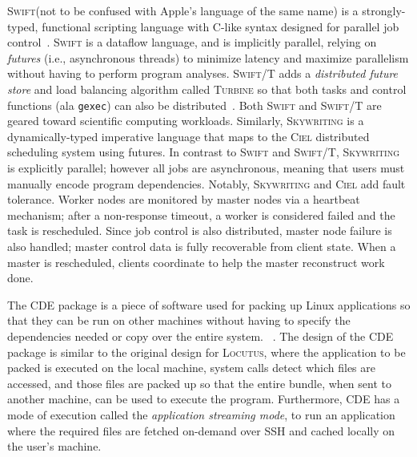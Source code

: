 \documentclass[11pt]{article}
\newcommand{\locutus}{\textsc{Locutus}\xspace}
\newcommand{\cde}{\textsc{CDE}\xspace}
\newcommand{\gexec}{\texttt{gexec}}
\newcommand{\swift}{\textsc{Swift}\xspace}
\newcommand{\swiftt}{\textsc{Swift/T}\xspace}
\newcommand{\turbine}{\textsc{Turbine}\xspace}
\newcommand{\ciel}{\textsc{Ciel}\xspace}
\newcommand{\skywriting}{\textsc{Skywriting}\xspace}
\begin{document}
\swift (not to be confused with Apple's language of the same name) is a strongly-typed, functional scripting language with C-like syntax designed for parallel job control~\cite{WILDE2011633}.  \swift is a dataflow language, and is implicitly parallel, relying on \emph{futures} (i.e., asynchronous threads) to minimize latency and maximize parallelism without having to perform program analyses.  \swiftt adds a \emph{distributed future store} and load balancing algorithm called \turbine so that both tasks and control functions (ala \gexec) can also be distributed~\cite{10.1145/2442516.2442559,6546066}.  Both \swift and \swiftt are geared toward scientific computing workloads.  Similarly, \skywriting is a dynamically-typed imperative language that maps to the \ciel distributed scheduling system using futures.  In contrast to \swift and \swiftt, \skywriting is explicitly parallel; however all jobs are asynchronous, meaning that users must manually encode program dependencies.  Notably, \skywriting and \ciel add fault tolerance.  Worker nodes are monitored by master nodes via a heartbeat mechanism; after a non-response timeout, a worker is considered failed and the task is rescheduled.  Since job control is also distributed, master node failure is also handled; master control data is fully recoverable from client state.  When a master is rescheduled, clients coordinate to help the master reconstruct work done.







The \cde package is a piece of software used for packing up Linux applications so that they can be run on other machines without having to specify the dependencies needed or copy over the entire system. ~\cite{10.1109/MCSE.2012.36, 10.5555/2002181.2002202}. The design of the \cde package is similar to the original design for \locutus, where the application to be packed is executed on the local machine, system calls detect which files are accessed, and those files are packed up so that the entire bundle, when sent to another machine, can be used to execute the program. Furthermore, \cde has a mode of execution called the \textit{application streaming mode}, to run an application where the required files are fetched on-demand over SSH and cached locally on the user's machine.
\end{document}
